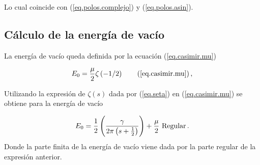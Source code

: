 Lo cual coincide con (\ref{eq.polos.complejo}) y (\ref{eq.polos.asin}).

\subsection{Cálculo de la energía de vacío} 

La energía de vacío queda definida por la ecuación (\ref{eq.casimir.mu})

\begin{equation}
    E _0 = \frac{\mu }{2}  
    \zeta  \left( - 1/2 \right) 
    \tag{\ref{eq.casimir.mu}} \, ,
\end{equation}

Utilizando la expresión de $\zeta  (s )$ dada por (\ref{eq.seta}) en (\ref{eq.casimir.mu}) se obtiene para la energía de vacío

\begin{equation}
E _0 = \frac{1}{2} \left(
				\frac{\gamma}{2 \pi \left( s+\frac{1}{2} \right) }
				\right) + 
				\frac{\mu}{2} \ {\rm Regular}
\, .
\end{equation}
Donde la parte finita de la energía de vacío viene dada por la parte regular de la expresión anterior.
